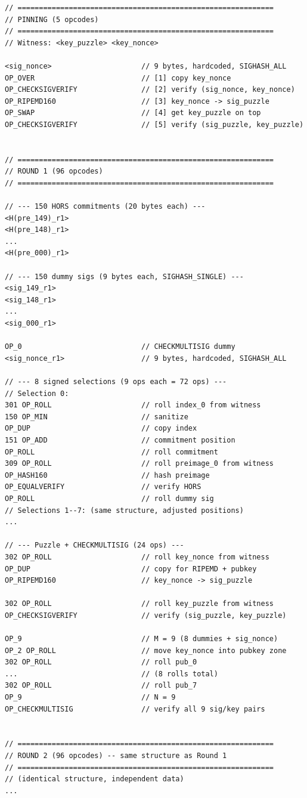 \documentclass[11pt, a4paper]{article}
\begin{document}
\begin{lstlisting}[language={}, numbers=none]
// ============================================================
// PINNING (5 opcodes)
// ============================================================
// Witness: <key_puzzle> <key_nonce>

<sig_nonce>                     // 9 bytes, hardcoded, SIGHASH_ALL
OP_OVER                         // [1] copy key_nonce
OP_CHECKSIGVERIFY               // [2] verify (sig_nonce, key_nonce)
OP_RIPEMD160                    // [3] key_nonce -> sig_puzzle
OP_SWAP                         // [4] get key_puzzle on top
OP_CHECKSIGVERIFY               // [5] verify (sig_puzzle, key_puzzle)


// ============================================================
// ROUND 1 (96 opcodes)
// ============================================================

// --- 150 HORS commitments (20 bytes each) ---
<H(pre_149)_r1>
<H(pre_148)_r1>
...
<H(pre_000)_r1>

// --- 150 dummy sigs (9 bytes each, SIGHASH_SINGLE) ---
<sig_149_r1>
<sig_148_r1>
...
<sig_000_r1>

OP_0                            // CHECKMULTISIG dummy
<sig_nonce_r1>                  // 9 bytes, hardcoded, SIGHASH_ALL

// --- 8 signed selections (9 ops each = 72 ops) ---
// Selection 0:
301 OP_ROLL                     // roll index_0 from witness
150 OP_MIN                      // sanitize
OP_DUP                          // copy index
151 OP_ADD                      // commitment position
OP_ROLL                         // roll commitment
309 OP_ROLL                     // roll preimage_0 from witness
OP_HASH160                      // hash preimage
OP_EQUALVERIFY                  // verify HORS
OP_ROLL                         // roll dummy sig
// Selections 1--7: (same structure, adjusted positions)
...

// --- Puzzle + CHECKMULTISIG (24 ops) ---
302 OP_ROLL                     // roll key_nonce from witness
OP_DUP                          // copy for RIPEMD + pubkey
OP_RIPEMD160                    // key_nonce -> sig_puzzle

302 OP_ROLL                     // roll key_puzzle from witness
OP_CHECKSIGVERIFY               // verify (sig_puzzle, key_puzzle)

OP_9                            // M = 9 (8 dummies + sig_nonce)
OP_2 OP_ROLL                    // move key_nonce into pubkey zone
302 OP_ROLL                     // roll pub_0
...                             // (8 rolls total)
302 OP_ROLL                     // roll pub_7
OP_9                            // N = 9
OP_CHECKMULTISIG                // verify all 9 sig/key pairs


// ============================================================
// ROUND 2 (96 opcodes) -- same structure as Round 1
// ============================================================
// (identical structure, independent data)
...
\end{lstlisting}
\end{document}
